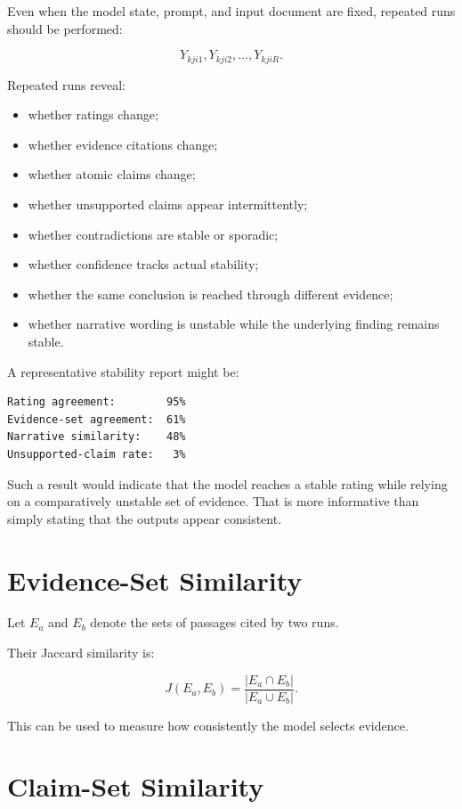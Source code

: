 \documentclass[11pt]{report}
\begin{document}
Even when the model state, prompt, and input document are fixed, repeated runs should be performed:

\[
Y_{kji1},
Y_{kji2},
\ldots,
Y_{kjiR}.
\]

Repeated runs reveal:

\begin{itemize}
  \item whether ratings change;
  \item whether evidence citations change;
  \item whether atomic claims change;
  \item whether unsupported claims appear intermittently;
  \item whether contradictions are stable or sporadic;
  \item whether confidence tracks actual stability;
  \item whether the same conclusion is reached through different evidence;
  \item whether narrative wording is unstable while the underlying finding remains stable.
\end{itemize}

A representative stability report might be:

\begin{verbatim}
Rating agreement:        95%
Evidence-set agreement:  61%
Narrative similarity:    48%
Unsupported-claim rate:   3%
\end{verbatim}

Such a result would indicate that the model reaches a stable rating while relying on a comparatively unstable set of evidence. That is more informative than simply stating that the outputs appear consistent.

\section{Evidence-Set Similarity}

Let $E_a$ and $E_b$ denote the sets of passages cited by two runs.

Their Jaccard similarity is:

\[
J(E_a,E_b)
=
\frac{|E_a\cap E_b|}
     {|E_a\cup E_b|}.
\]

This can be used to measure how consistently the model selects evidence.

\section{Claim-Set Similarity}
\end{document}
